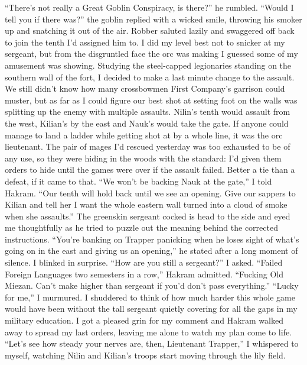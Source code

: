 \documentclass[12pt, openany]{book}
\begin{document}
“There’s not really a Great Goblin Conspiracy, is there?” he rumbled.
“Would I tell you if there was?” the goblin replied with a wicked smile, throwing his smoker up and snatching it out of the air.
Robber saluted lazily and swaggered off back to join the tenth I’d assigned him to. I did my level best not to snicker at my sergeant, but from the disgruntled face the orc was making I guessed some of my amusement was showing. Studying the steel-capped legionaries standing on the southern wall of the fort, I decided to make a last minute change to the assault. We still didn’t know how many crossbowmen First Company’s garrison could muster, but as far as I could figure our best shot at setting foot on the walls was splitting up the enemy with multiple assaults. Nilin’s tenth would assault from the west, Kilian’s by the east and Nauk’s would take the gate. If anyone could manage to land a ladder while getting shot at by a whole line, it was the orc lieutenant. The pair of mages I’d rescued yesterday was too exhausted to be of any use, so they were hiding in the woods with the standard: I’d given them orders to hide until the games were over if the assault failed. Better a tie than a defeat, if it came to that.
“We won’t be backing Nauk at the gate,” I told Hakram. “Our tenth will hold back until we see an opening. Give our sappers to Kilian and tell her I want the whole eastern wall turned into a cloud of smoke when she assaults.”
The greenskin sergeant cocked is head to the side and eyed me thoughtfully as he tried to puzzle out the meaning behind the corrected instructions.
“You’re banking on Trapper panicking when he loses sight of what’s going on in the east and giving us an opening,” he stated after a long moment of silence.
I blinked in surprise.
“How are you still a sergeant?” I asked.
“Failed Foreign Languages two semesters in a row,” Hakram admitted. “Fucking Old Miezan. Can’t make higher than sergeant if you’d don’t pass everything.”
“Lucky for me,” I murmured.
I shuddered to think of how much harder this whole game would have been without the tall sergeant quietly covering for all the gaps in my military education. I got a pleased grin for my comment and Hakram walked away to spread my last orders, leaving me alone to watch my plan come to life.
“Let’s see how steady your nerves are, then, Lieutenant Trapper,” I whispered to myself, watching Nilin and Kilian’s troops start moving through the lily field.
\end{document}

